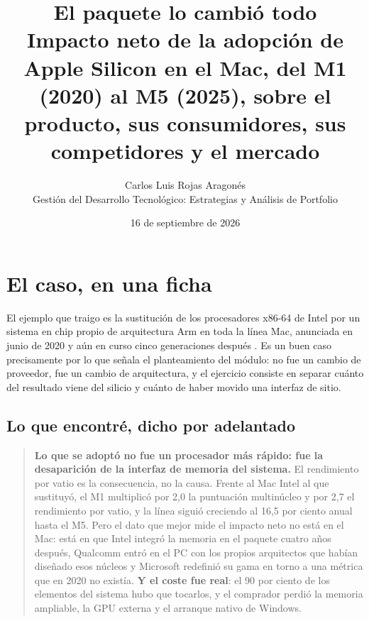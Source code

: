 \documentclass[11pt,letterpaper]{article}
\title{\vspace{-1.2cm}\textbf{El paquete lo cambió todo}\\
\large Impacto neto de la adopción de Apple Silicon en el Mac, del M1 (2020)
al M5 (2025), sobre el producto, sus consumidores, sus competidores y el
mercado}
\author{Carlos Luis Rojas Aragonés\\
\small Gestión del Desarrollo Tecnológico: Estrategias y Análisis de Portfolio}
\date{\small 16 de septiembre de 2026}
\begin{document}
\maketitle
\vspace{-0.8em}

\section{El caso, en una ficha}

El ejemplo que traigo es la sustitución de los procesadores x86-64 de Intel
por un sistema en chip propio de arquitectura Arm en toda la línea Mac,
anunciada en junio de 2020 y aún en curso cinco generaciones después
\autocite{apple2020transicion}. Es un buen caso precisamente por lo que señala
el planteamiento del módulo: no fue un cambio de proveedor, fue un cambio de
arquitectura, y el ejercicio consiste en separar cuánto del resultado viene
del silicio y cuánto de haber movido una interfaz de sitio.

\subsection*{Lo que encontré, dicho por adelantado}

\begin{quote}
\textbf{Lo que se adoptó no fue un procesador más rápido: fue la desaparición
de la interfaz de memoria del sistema.} El rendimiento por vatio es la
consecuencia, no la causa. Frente al Mac Intel al que sustituyó, el M1
multiplicó por 2,0 la puntuación multinúcleo y por 2,7 el rendimiento por
vatio, y la línea siguió creciendo al 16,5 por ciento anual hasta el M5. Pero
el dato que mejor mide el impacto neto no está en el Mac: está en que Intel
integró la memoria en el paquete cuatro años después, Qualcomm entró en el PC
con los propios arquitectos que habían diseñado esos núcleos y Microsoft
redefinió su gama en torno a una métrica que en 2020 no existía. \textbf{Y el
coste fue real}: el 90 por ciento de los elementos del sistema hubo que
tocarlos, y el comprador perdió la memoria ampliable, la GPU externa y el
arranque nativo de Windows.
\end{quote}
\end{document}
